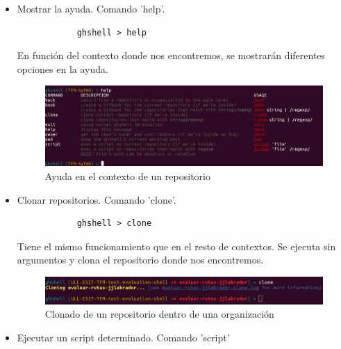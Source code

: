 \begin{itemize}

	\item Mostrar la ayuda. Comando 'help'.
		
		\begin{verbatim}
			ghshell > help
		\end{verbatim}
		
		En función del contexto donde nos encontremos, se mostrarán diferentes opciones en la ayuda.
				
		\begin{figure}[H]
		\begin{center}
		\includegraphics[width=1\textwidth]{images/help1-3}
		\caption{Ayuda en el contexto de un repositorio}
		\label{fig:help1-2}
		\end{center}
		\end{figure}

	\item Clonar repositorios. Comando 'clone'.
	
		\begin{verbatim}
			ghshell > clone
		\end{verbatim}
		
		Tiene el mismo funcionamiento que en el resto de contextos. Se ejecuta sin argumentos y clona el repositorio donde nos encontremos.
		
		\begin{figure}[H]
		\begin{center}
		\includegraphics[width=1\textwidth]{images/clone1-4}
		\caption{Clonado de un repositorio dentro de una organización}
		\label{fig:clone1-4}
		\end{center}
		\end{figure}
		
	\item Ejecutar un script determinado. Comando 'script'
	

\end{itemize}
